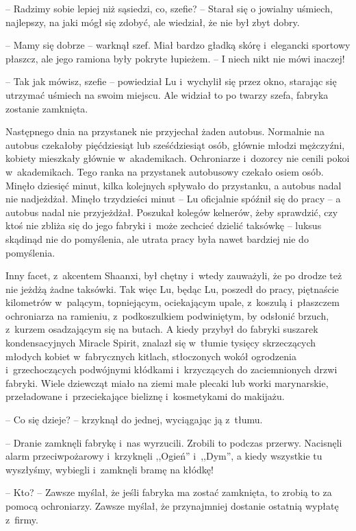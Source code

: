 \documentclass[oneside,polish,11pt,rmheadings]{mwbk}
\begin{document}
-- Radzimy sobie lepiej niż sąsiedzi, co, szefie? -- Starał się o jowialny uśmiech, najlepszy, na jaki mógł się zdobyć, ale wiedział, że nie był zbyt dobry. 


-- Mamy się dobrze -- warknął szef. Miał bardzo gładką skórę i~elegancki sportowy płaszcz, ale jego ramiona były pokryte łupieżem. -- I niech nikt nie mówi inaczej!  


-- Tak jak mówisz, szefie -- powiedział Lu i~wychylił się przez okno, starając się utrzymać uśmiech na swoim miejscu. Ale widział to po twarzy szefa, fabryka zostanie zamknięta. 


Następnego dnia na przystanek nie przyjechał żaden autobus. Normalnie na autobus czekałoby pięćdziesiąt lub sześćdziesiąt osób, głównie młodzi mężczyźni, kobiety mieszkały głównie w~akademikach. Ochroniarze i~dozorcy nie cenili pokoi w~akademikach. Tego ranka na przystanek autobusowy czekało osiem osób. Minęło dziesięć minut, kilka kolejnych spływało do przystanku, a autobus nadal nie nadjeżdżał. Minęło trzydzieści minut -- Lu oficjalnie spóźnił się do pracy -- a autobus nadal nie przyjeżdżał. Poszukał kolegów kelnerów, żeby sprawdzić, czy ktoś nie zbliża się do jego fabryki i~może zechcieć dzielić taksówkę -- luksus skądinąd nie do pomyślenia, ale utrata pracy była nawet bardziej nie do pomyślenia. 


Inny facet, z~akcentem Shaanxi, był chętny i~wtedy zauważyli, że po drodze też nie jeżdżą żadne taksówki. Tak więc Lu, będąc Lu, poszedł do pracy, piętnaście kilometrów w~palącym, topniejącym, ociekającym upale, z~koszulą i~płaszczem ochroniarza na ramieniu, z~podkoszulkiem podwiniętym, by odsłonić brzuch, z~kurzem osadzającym się na butach. A kiedy przybył do fabryki suszarek kondensacyjnych Miracle Spirit, znalazł się w~tłumie tysięcy skrzeczących młodych kobiet w~fabrycznych kitlach, stłoczonych wokół ogrodzenia i~grzechoczących podwójnymi kłódkami i~krzyczących do zaciemnionych drzwi fabryki. Wiele dziewcząt miało na ziemi małe plecaki lub worki marynarskie, przeładowane i~przeciekające bieliznę i~kosmetykami do makijażu. 


-- Co się dzieje? -- krzyknął do jednej, wyciągając ją z~tłumu. 


-- Dranie zamknęli fabrykę i~nas wyrzucili. Zrobili to podczas przerwy. Nacisnęli alarm przeciwpożarowy i~krzyknęli ,,Ogień'' i~,,Dym'', a kiedy wszystkie tu wyszłyśmy, wybiegli i~zamknęli bramę na kłódkę! 


-- Kto? -- Zawsze myślał, że jeśli fabryka ma zostać zamknięta, to zrobią to za pomocą ochroniarzy. Zawsze myślał, że przynajmniej dostanie ostatnią wypłatę z~firmy. 
\end{document}
